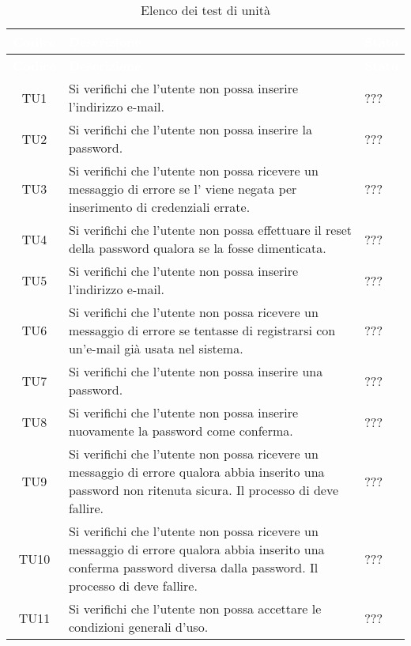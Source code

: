 {
\renewcommand{\arraystretch}{1.5}
\centering
\begin{longtable}{ c C{13cm} C{1cm}}
\caption{Elenco dei test di unità}\\
\textcolor{white}{\textbf{Codice}} & \textcolor{white}{\textbf{Descrizione}} & \textcolor{white}{\textbf{Stato}}\\
\endfirsthead
{}
\textcolor{white}{\textbf{Codice}} & \textcolor{white}{\textbf{Descrizione}} & \textcolor{white}{\textbf{Stato}}\\
\endhead

TU1 & Si verifichi che l'utente non  possa inserire l'indirizzo e-mail. & ??? \\
TU2 & Si verifichi che l'utente non  possa inserire la password. & ??? \\
TU3 & Si verifichi che l'utente non  possa ricevere un messaggio di errore se l' viene negata per inserimento di credenziali errate. & ??? \\
TU4 & Si verifichi che l'utente non  possa effettuare il reset della password qualora se la fosse dimenticata. & ??? \\
TU5 & Si verifichi che l’utente non  possa inserire l'indirizzo e-mail. & ??? \\
TU6 & Si verifichi che l’utente non  possa ricevere un messaggio di errore se tentasse di registrarsi con un'e-mail già usata nel sistema.  & ??? \\
TU7 & Si verifichi che l’utente non  possa inserire una password. & ??? \\
TU8 & Si verifichi che l’utente non  possa inserire nuovamente la password come conferma. & ??? \\
TU9 & Si verifichi che l’utente non  possa ricevere un messaggio di errore qualora abbia inserito una password non ritenuta sicura. Il processo di  deve fallire. & ??? \\
TU10 & Si verifichi che l’utente non  possa ricevere un messaggio di errore qualora abbia inserito una conferma password diversa dalla password. Il processo di  deve fallire. & ??? \\
TU11 & Si verifichi che l’utente non  possa accettare le condizioni generali d'uso. & ??? \\

\end{longtable}}
